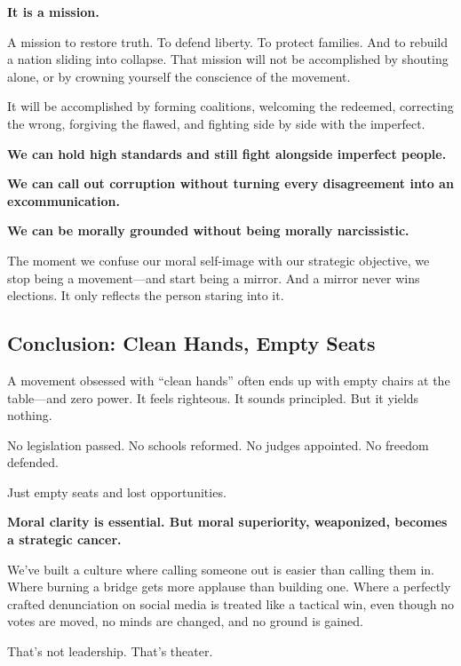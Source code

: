 \textbf{It is a mission.}

A mission to restore truth. To defend liberty. To protect families. And to rebuild a nation sliding into collapse. That mission will not be accomplished by shouting alone, or by crowning yourself the conscience of the movement.

It will be accomplished by forming coalitions, welcoming the redeemed, correcting the wrong, forgiving the flawed, and fighting side by side with the imperfect.

\textbf{We can hold high standards and still fight alongside imperfect people.}

\textbf{We can call out corruption without turning every disagreement into an excommunication.}

\textbf{We can be morally grounded without being morally narcissistic.}

The moment we confuse our moral self-image with our strategic objective, we stop being a movement—and start being a mirror. And a mirror never wins elections. It only reflects the person staring into it.











\subsection*{Conclusion: Clean Hands, Empty Seats}

A movement obsessed with ``clean hands'' often ends up with empty chairs at the table—and zero power. It feels righteous. It sounds principled. But it yields nothing.

No legislation passed. No schools reformed. No judges appointed. No freedom defended.

Just empty seats and lost opportunities.

\textbf{Moral clarity is essential. But moral superiority, weaponized, becomes a strategic cancer.}

We’ve built a culture where calling someone out is easier than calling them in. Where burning a bridge gets more applause than building one. Where a perfectly crafted denunciation on social media is treated like a tactical win, even though no votes are moved, no minds are changed, and no ground is gained.

That’s not leadership. That’s theater.

